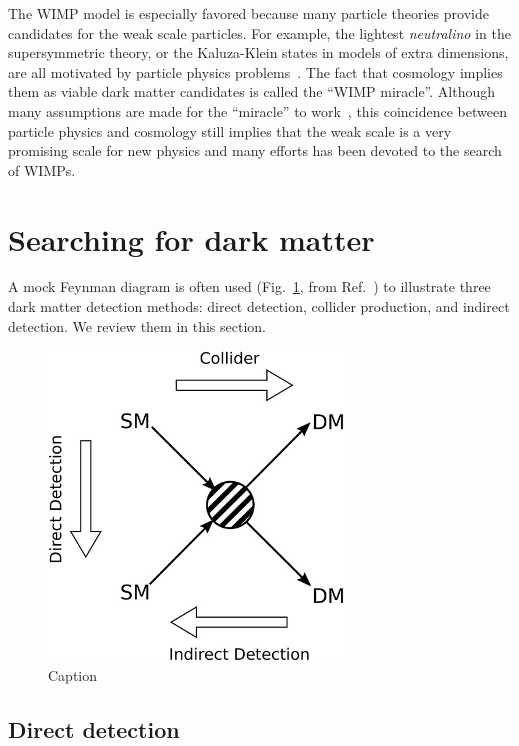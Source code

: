 \documentclass[doublespace,nopageskip]{VTthesis} %
\begin{document}
The WIMP model is especially favored because many particle theories provide candidates for the weak scale particles. For example, the lightest \textit{neutralino} in the supersymmetric theory, or the Kaluza-Klein states in models of extra dimensions, are all motivated by particle physics problems~\cite{2005PhR...405..279B}. The fact that cosmology implies them as viable dark matter candidates is called the ``WIMP miracle''. Although many assumptions are made for the ``miracle'' to work~\cite{2019arXiv190407915L}, this coincidence between particle physics and cosmology still implies that the weak scale is a very promising scale for new physics and many efforts has been devoted to the search of WIMPs.

\section{Searching for dark matter}

A mock Feynman diagram is often used (Fig.~\ref{fig:dm_search}, from Ref.~\cite{2019FrP.....7...75G}) to illustrate three dark matter detection methods: direct detection, collider production, and indirect detection. We review them in this section.

\begin{figure}[htb]
    \centering
    \includegraphics[width=0.7\textwidth]{Figures/Intro/dm_diagram.jpg}
    \caption{Caption}
    \label{fig:dm_search}
\end{figure}

\subsection{Direct detection}
\end{document}

